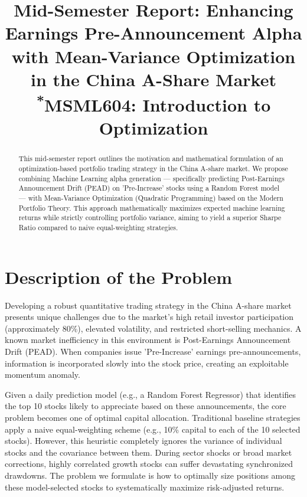 \documentclass[conference]{IEEEtran}
\begin{document}
\title{Mid-Semester Report: Enhancing Earnings Pre-Announcement Alpha with Mean-Variance Optimization in the China A-Share Market\\
{\footnotesize \textsuperscript{*}MSML604: Introduction to Optimization}}

\author{
\and
{}
}

\maketitle

\begin{abstract}
This mid-semester report outlines the motivation and mathematical formulation of an optimization-based portfolio trading strategy in the China A-share market. We propose combining Machine Learning alpha generation --- specifically predicting Post-Earnings Announcement Drift (PEAD) on 'Pre-Increase' stocks using a Random Forest model --- with Mean-Variance Optimization (Quadratic Programming) based on the Modern Portfolio Theory. This approach mathematically maximizes expected machine learning returns while strictly controlling portfolio variance, aiming to yield a superior Sharpe Ratio compared to naive equal-weighting strategies.
\end{abstract}

\section{Description of the Problem}
Developing a robust quantitative trading strategy in the China A-share market presents unique challenges due to the market's high retail investor participation (approximately 80\%), elevated volatility, and restricted short-selling mechanics. A known market inefficiency in this environment is Post-Earnings Announcement Drift (PEAD). When companies issue 'Pre-Increase' earnings pre-announcements, information is incorporated slowly into the stock price, creating an exploitable momentum anomaly.

Given a daily prediction model (e.g., a Random Forest Regressor) that identifies the top 10 stocks likely to appreciate based on these announcements, the core problem becomes one of optimal capital allocation. Traditional baseline strategies apply a naive equal-weighting scheme (e.g., 10\% capital to each of the 10 selected stocks). However, this heuristic completely ignores the variance of individual stocks and the covariance between them. During sector shocks or broad market corrections, highly correlated growth stocks can suffer devastating synchronized drawdowns. The problem we formulate is how to optimally size positions among these model-selected stocks to systematically maximize risk-adjusted returns.
\end{document}
